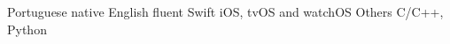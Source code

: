 \begin{cvskills}
  \cvskill
    {Portuguese}
    {native}
  \cvskill
    {English}
    {fluent}
  \cvskill
    {Swift}
    {iOS, tvOS and watchOS}
  \cvskill
    {Others}
    {C/C++, Python}
\end{cvskills}
